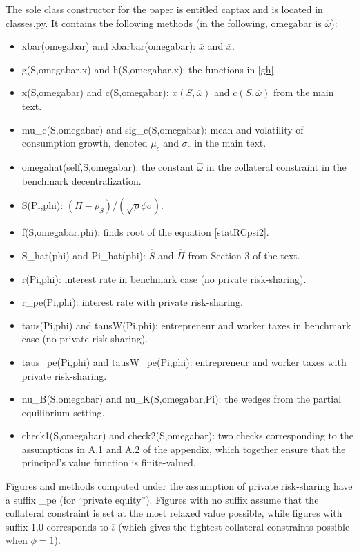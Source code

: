 \documentclass[11pt]{article}
\theoremstyle{plain}
\theoremstyle{definition} %
\begin{document}
The sole class constructor for the paper is entitled captax and is located in classes.py. It contains the following methods (in the following, omegabar is $\overline{\omega}$):
\begin{itemize}
\item xbar(omegabar) and xbarbar(omegabar): $\overline{x}$ and $\overline{\overline{x}}$.
\item g(S,omegabar,x) and h(S,omegabar,x): the functions in \eqref{gh}.
\item x(S,omegabar) and c(S,omegabar): $x(S,\overline{\omega})$ and $\overline{c}(S,\overline{\omega})$ from the main text.
\item mu\_c(S,omegabar) and sig\_c(S,omegabar): mean and volatility of consumption growth, denoted $\mu_c$ and $\sigma_c$ in the main text.
\item omegahat(self,S,omegabar): the constant $\hat{\omega}$ in the collateral constraint in the benchmark decentralization.
\item S(Pi,phi): $(\Pi - \rho_S)/(\sqrt{\rho}\phi \sigma)$.
\item f(S,omegabar,phi): finds root of the equation \eqref{statRCpsi2}.
\item S\_hat(phi) and Pi\_hat(phi): $\hat{S}$ and $\hat{\Pi}$ from Section 3 of the text.
\item r(Pi,phi): interest rate in benchmark case (no private risk-sharing).
\item r\_pe(Pi,phi): interest rate with private risk-sharing.
\item taus(Pi,phi) and tausW(Pi,phi): entrepreneur and worker taxes in benchmark case (no private risk-sharing).    
\item taus\_pe(Pi,phi) and tausW\_pe(Pi,phi): entrepreneur and worker taxes with private risk-sharing.    
\item nu\_B(S,omegabar) and nu\_K(S,omegabar,Pi): the wedges from the partial equilibrium setting. 
\item check1(S,omegabar) and check2(S,omegabar): two checks corresponding to the assumptions in A.1 and A.2 of the appendix, which together ensure that the principal's value function is finite-valued. 
\end{itemize}

Figures and methods computed under the assumption of private risk-sharing have a suffix \_pe (for ``private equity''). Figures with no suffix assume that the collateral constraint is set at the most relaxed value possible, while figures with suffix 1.0 corresponds to $\overline{\iota}$ (which gives the tightest collateral constraints possible when $\phi =1$). 
\end{document}

